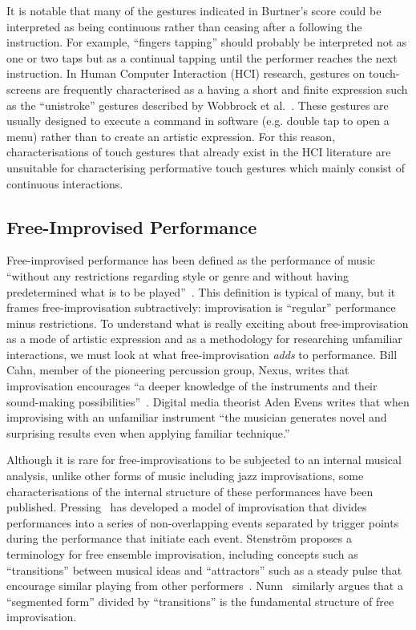 \documentclass[graybox]{svmult}
\begin{document}
It is notable that many of the gestures indicated in Burtner's score
could be interpreted as being continuous rather than ceasing after a
following the instruction. For example, ``fingers tapping'' should
probably be interpreted not as one or two taps but as a continual
tapping until the performer reaches the next instruction. In Human Computer 
Interaction (HCI) 
research, gestures on touch-screens are frequently characterised as a
having a short and finite expression such as the ``unistroke''
gestures described by Wobbrock et al.~\cite{Wobbrock:2007kq}. These
gestures are usually designed to execute a command in software (e.g.
double tap to open a menu) rather than to create an artistic
expression. For this reason, characterisations of touch gestures that
already exist in the HCI literature are unsuitable for characterising
performative touch gestures which mainly consist of continuous
interactions.

\subsection{Free-Improvised Performance}
\label{subsec:free-improvisation}

Free-improvised performance has been defined as the performance of
music ``without any restrictions regarding style or genre and without
having predetermined what is to be played''~\cite{Stenstrom:2009xy}.
This definition is typical of many, but it frames
free-improvisation subtractively: improvisation is ``regular''
performance minus restrictions. To understand what is really exciting
about free-improvisation as a mode of artistic expression and as a
methodology for researching unfamiliar interactions, we must look at
what free-improvisation \emph{adds} to performance. Bill Cahn, member
of the pioneering percussion group, Nexus, writes that improvisation
encourages ``a deeper knowledge of the instruments and their
sound-making possibilities''~\cite{Cahn:2005uq}. Digital media
theorist Aden Evens writes that when improvising with an unfamiliar
instrument ``the musician generates novel and surprising results even
when applying familiar technique.''~\cite{Evens:2005kx}

Although it is rare for free-improvisations to be subjected to an
internal musical analysis, unlike other forms of music including jazz
improvisations, some characterisations of the internal structure of
these performances have been published.
Pressing~\cite{Pressing:1988uo} has developed a model of improvisation
that divides performances into a series of non-overlapping events
separated by trigger points during the performance that initiate each
event. Stenstr\"om proposes a terminology for free ensemble
improvisation, including concepts such as ``transitions'' between
musical ideas and ``attractors'' such as a steady pulse that encourage
similar playing from other performers~\cite{Stenstrom:2009xy}.
Nunn~\cite{Nunn:1998ly} similarly argues that a ``segmented form''
divided by ``transitions'' is the fundamental structure of free
improvisation.
\end{document}
